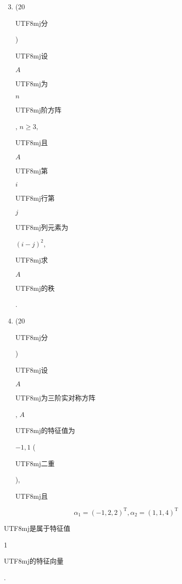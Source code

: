 \documentclass[10pt]{article}
\begin{document}
\begin{enumerate}
  \setcounter{enumi}{2}
  \item (20 \begin{CJK}{UTF8}{mj}分\end{CJK}) \begin{CJK}{UTF8}{mj}设\end{CJK} $A$ \begin{CJK}{UTF8}{mj}为\end{CJK} $n$ \begin{CJK}{UTF8}{mj}阶方阵\end{CJK}, $n \geqslant 3$, \begin{CJK}{UTF8}{mj}且\end{CJK} $A$ \begin{CJK}{UTF8}{mj}第\end{CJK} $i$ \begin{CJK}{UTF8}{mj}行第\end{CJK} $j$ \begin{CJK}{UTF8}{mj}列元素为\end{CJK} $(i-j)^{2}$, \begin{CJK}{UTF8}{mj}求\end{CJK} $A$ \begin{CJK}{UTF8}{mj}的秩\end{CJK}.

  \item (20 \begin{CJK}{UTF8}{mj}分\end{CJK}) \begin{CJK}{UTF8}{mj}设\end{CJK} $A$ \begin{CJK}{UTF8}{mj}为三阶实对称方阵\end{CJK}, $A$ \begin{CJK}{UTF8}{mj}的特征值为\end{CJK} $-1,1$ (\begin{CJK}{UTF8}{mj}二重\end{CJK}), \begin{CJK}{UTF8}{mj}且\end{CJK}

\end{enumerate}
$$
\alpha_{1}=(-1,2,2)^{\mathrm{T}}, \alpha_{2}=(1,1,4)^{\mathrm{T}}
$$
\begin{CJK}{UTF8}{mj}是属于特征值\end{CJK} 1 \begin{CJK}{UTF8}{mj}的特征向量\end{CJK}.
\end{document}
